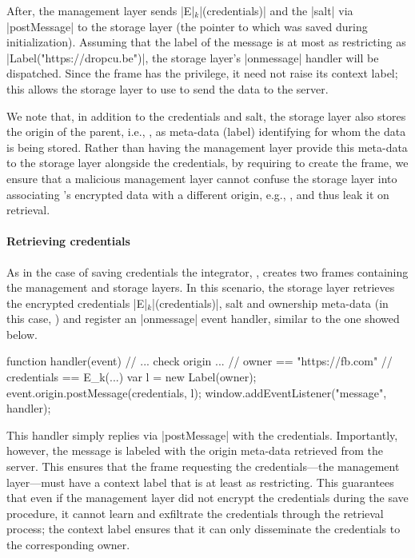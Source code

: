 After, the management layer sends \js|E|$_k$\js|(credentials)| and the
\js|salt| via \js|postMessage| to the storage layer (the pointer to
which was saved during initialization).
%
Assuming that the label of the message is at most as restricting as
\js|Label("https://dropcu.be")|, the storage layer's \js|onmessage|
handler will be dispatched. 
%
Since the frame has the  privilege, it need not raise
its context label; this allows the storage layer to use \xhr{} to send
the data to the server. 
 
We note that, in addition to the credentials and salt, the storage
layer also stores the origin of the parent, i.e., , as
meta-data (label) identifying for whom the data is being stored.
%
Rather than having the management layer provide this meta-data to the
storage layer alongside the credentials, by requiring 
to create the frame, we ensure that a malicious management layer
cannot confuse the storage layer into associating 's
encrypted data with a different origin, e.g., , and thus
leak it on retrieval.

\paragraph{Retrieving credentials}
%
As in the case of saving credentials the integrator, ,
creates two frames containing the management and storage layers.
%
In this scenario, the storage layer retrieves the encrypted credentials
\js|E|$_k$\js|(credentials)|, salt and ownership meta-data (in this
case, ) and register an \js|onmessage| event handler, 
similar to the one showed below.
\begin{jscode}
function handler(event) {
  // ... check origin ...
  // owner == "https://fb.com"
  // credentials == E_k(...)
  var l = new Label(owner);
  event.origin.postMessage(credentials, l);
} 
window.addEventListener("message", handler);
\end{jscode}
This handler simply replies via \js|postMessage| with the credentials.
%
Importantly, however, the message is labeled with the origin meta-data
retrieved from the server.
%
This ensures that the frame requesting the credentials---the
management layer---must have a context label that is at least as
restricting.
%
This guarantees that even if the management layer did not encrypt the
credentials during the save procedure, it cannot learn and
exfiltrate the credentials through the retrieval process; the context
label ensures that it can only disseminate the credentials to the
corresponding owner.
%

